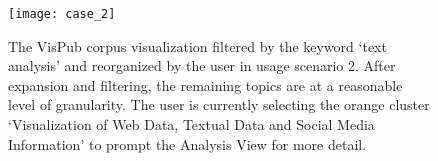 
\begin{figure}%
    \centering
    \texttt{[image: case\_2]}
    \caption{
    The VisPub corpus visualization filtered by the keyword `text analysis' and reorganized by the user in usage scenario 2.
    After expansion and filtering, the remaining topics are at a reasonable level of granularity.
    The user is currently selecting the orange cluster `Visualization of Web Data, Textual Data and Social Media Information' to prompt the Analysis View for more detail.
    }%
    \label{fig: case_2}%
\end{figure}



